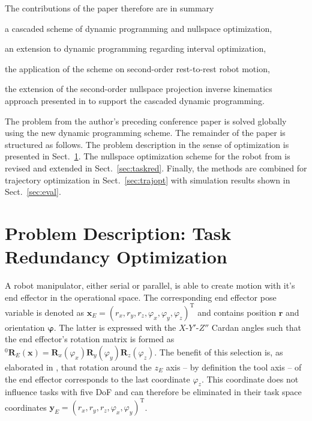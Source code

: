 \documentclass[runningheads]{llncs}
\newcommand{\bm}[1]{\boldsymbol{#1}}
\renewcommand{\vec}[1]{\boldsymbol{#1}}
\newcommand{\rotmat}[2]{{{ }^{#1}\boldsymbol{R}}_{#2}}
\newcommand{\transp}[0]{{\mathrm{T}}}
\begin{document}

\newpage
The contributions of the paper therefore are in summary
\begin{compactitem}
\item a cascaded scheme of dynamic programming and nullspace optimization, %
\item an extension to dynamic programming regarding interval optimization,
\item the application of the scheme on second-order rest-to-rest robot motion,%
\item the extension of the second-order nullspace projection inverse kinematics approach presented in \cite{SchapplerOrt2021} to support the cascaded dynamic programming.
\end{compactitem}
%
The problem from the author's preceding conference paper \cite{SchapplerOrt2021} is solved globally using the new dynamic programming scheme.
%
The remainder of the paper is structured as follows.
The problem description in the sense of optimization is presented in Sect.~\ref{sec:problem}.
The nullspace optimization scheme for the robot from \cite{SchapplerOrt2021} is revised and extended in Sect.~\ref{sec:taskred}.
Finally, the methods are combined for trajectory optimization in Sect.~\ref{sec:trajopt} with simulation results shown in Sect.~\ref{sec:eval}.

\section{Problem Description: Task Redundancy Optimization}
\label{sec:problem}

A robot manipulator, either serial or parallel, is able to create motion with it's end effector in the operational space.
The corresponding end effector pose variable is denoted as 
$\bm{x}_E{=}(r_x,r_y,r_z,\varphi_x,\varphi_y,\varphi_z)^\transp$
and contains position $\vec{r}$ and orientation $\vec{\varphi}$.
The latter is expressed with the $X$-$Y'$-$Z''$ Cardan angles such that the end effector's rotation matrix is formed as $\rotmat{0}{E}(\bm{x}){=}\bm{R}_x(\varphi_x) \bm{R}_y(\varphi_y) \bm{R}_z(\varphi_z)$.
The benefit of this selection is, as elaborated in \cite{SchapplerOrt2021}, that rotation around the $z_E$ axis -- by definition the tool axis -- of the end effector corresponds to the last coordinate $\varphi_z$.
This coordinate does not influence tasks with five DoF and can therefore be eliminated in their task space coordinates ${\bm{y}_E{=}(r_x,r_y,r_z,\varphi_x,\varphi_y)^\transp}$.
\end{document}
